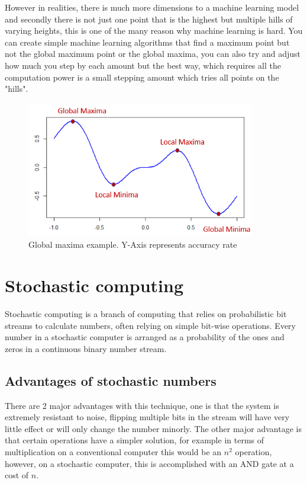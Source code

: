 \documentclass[a4paper,oneside,phd,etd]{BYUPhys}
\begin{document}
However in realities, there is much more dimensions to a machine learning model and secondly there is not just one point that is the highest but multiple hills of varying heights, this is one of the many reason why machine learning is hard. You can create simple machine learning algorithms that find a maximum point but not the global maximum point or the global maxima, you can also try and adjust how much you step by each amount but the best way, which requires all the computation power is a small stepping amount which tries all points on the "hills". 
\begin{figure}[H]
\centering
\includegraphics[width=10cm]{pictures/global_minima.png}
\caption{Global maxima example.
Y-Axis represents accuracy rate}
\label{fig:global_minima}
\end{figure}

\section{Stochastic computing}
Stochastic computing is a branch of computing that relies on probabilistic bit streams to calculate numbers, often relying on simple bit-wise operations. Every number in a stochastic computer is arranged as a probability of the ones and zeros in a continuous binary number stream. 

\subsection{Advantages of stochastic numbers}
There are 2 major advantages with this technique, one is that the system is extremely resistant to noise, flipping multiple bits in the stream will have very little effect or will only change the number minorly. The other major advantage is that certain operations have a simpler solution, for example in terms of multiplication on a conventional computer this would be an $n^2$ operation, however, on a stochastic computer, this is accomplished with an AND gate at a cost of $n$.
\end{document}
